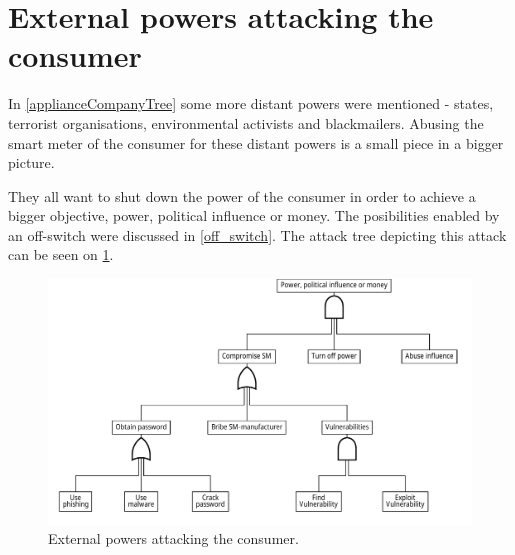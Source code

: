 
\section{External powers attacking the consumer}
In \cref{applianceCompanyTree} some more distant powers were mentioned - states, terrorist organisations, environmental activists and blackmailers.
Abusing the smart meter of the consumer for these distant powers is a small piece in a bigger picture.

They all want to shut down the power of the consumer in order to achieve a bigger objective, power, political influence or money.
The posibilities enabled by an off-switch were discussed in \cref{off_switch}.
The attack tree depicting this attack can be seen on \cref{fig:attack_trees:external}.

\begin{figure}[H]
  \centering
	\includegraphics[width=\textwidth]{figures/graphviz/offswitch.pdf}
	\caption{External powers attacking the consumer.}
	\label{fig:attack_trees:external}
\end{figure}
